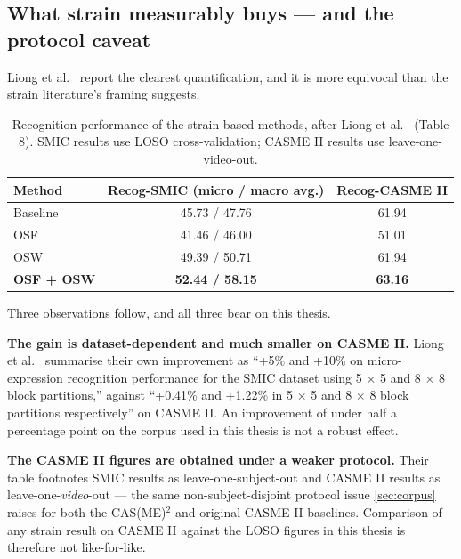 \subsection{What strain measurably buys --- and the protocol caveat}
\label{sec:strain-evidence}

Liong et al.~\cite{liong2016} report the clearest quantification, and it is more equivocal than the strain literature's framing suggests.

\begin{table}[htbp]
	\centering
	\begin{tabular}{l c c}
		\hline
		\textbf{Method} & \textbf{Recog-SMIC (micro / macro avg.)} & \textbf{Recog-CASME II} \\
		\hline
		Baseline           & 45.73 / 47.76 & 61.94 \\
		OSF                & 41.46 / 46.00 & 51.01 \\
		OSW                & 49.39 / 50.71 & 61.94 \\
		\textbf{OSF + OSW} & \textbf{52.44 / 58.15} & \textbf{63.16} \\
		\hline
	\end{tabular}
	\caption[Recognition performance of the strain-based methods]{Recognition performance of the strain-based methods, after Liong et al.~\cite{liong2016} (Table 8). SMIC results use LOSO cross-validation; CASME II results use leave-one-video-out.}
	\label{tab:strain-performance}
\end{table}

Three observations follow, and all three bear on this thesis.

\textbf{The gain is dataset-dependent and much smaller on CASME II.} Liong et al.~\cite{liong2016} summarise their own improvement as ``+5\% and +10\% on micro-expression recognition performance for the SMIC dataset using 5 $\times$ 5 and 8 $\times$ 8 block partitions,'' against ``+0.41\% and +1.22\% in 5 $\times$ 5 and 8 $\times$ 8 block partitions respectively'' on CASME II. An improvement of under half a percentage point on the corpus used in this thesis is not a robust effect.

\textbf{The CASME II figures are obtained under a weaker protocol.} Their table footnotes SMIC results as leave-one-subject-out and CASME II results as leave-one-\textit{video}-out --- the same non-subject-disjoint protocol issue \autoref{sec:corpus} raises for both the CAS(ME)$^2$ and original CASME II baselines. Comparison of any strain result on CASME II against the LOSO figures in this thesis is therefore not like-for-like.

